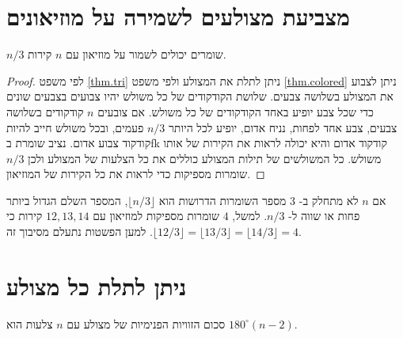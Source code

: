 
\section{מצביעת מצולעים לשמירה על מוזיאונים}\label{s.museum-guard}

\begin{theorem}
$n/3$
שומרים יכולים לשמור על מוזיאון עם 
$n$
קירות.
\end{theorem}
\begin{proof}
לפי משפט
\ref{thm.tri}
ניתן לתלת את המצולע ולפי משפט
\ref{thm.colored}
ניתן לצבוע את המצולע בשלושה צבעים. שלושת הקודקודים של כל משולש יהיו צבועים בצבעים שונים כדי שכל צבע יופיע באחד הקודקודים של כל משולש. אם צובעים 
$n$
קודקודים בשלושה צבעים, צבע אחד לפחות, נניח אדום, יופיע לכל היותר
$n/3$
פעמים, ובכל משולש חייב להיות קודקוד צבוע אדום. נציב שומרת בfk קודקוד אדום והיא יכולה לראות את הקירות של אותו משולש. כל המשולשים של תילות המצולע כוללים את כל הצלעות של המצולע ולכן
$n/3$
שומרות מספיקות כדי לראות את כל הקירות של המוזיאון.
\end{proof}

אם
$n$
לא מתחלק ב-%
$3$
מספר השומרות הדרושות הוא
$\lfloor n/3\rfloor$, 
המספר השלם הגדול ביותר פחות או שווה ל-%
$n/3$.
למשל, 
$4$
שומרות מספיקות למוזיאון עם 
$12, 13, 14$
קירות כי
$\lfloor 12/3\rfloor =\lfloor 13/3\rfloor=\lfloor 14/3\rfloor=4$. 
למען הפשטות נתעלם מסיבוך זה.


\newpage

\section{ניתן לתלת כל מצולע}\label{s.museum-triangulated}

\begin{theorem}\label{thm.interior-angles-of-a-polygon}
סכום הזוויות הפנימיות של מצולע עם
$n$
צלעות הוא
$180^\circ(n-2)$.
\end{theorem}

